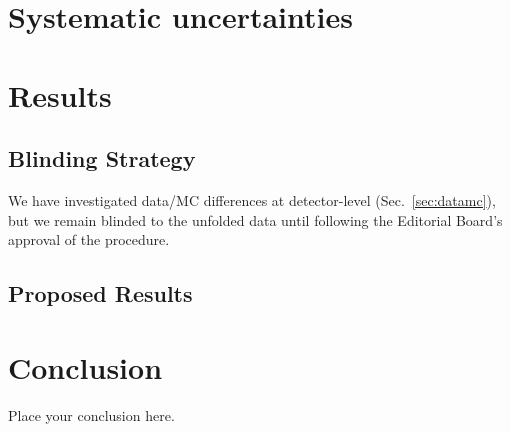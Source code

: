 \documentclass[NOTE, atlasdraft=true, texlive=2016, UKenglish]{\ATLASLATEXPATH atlasdoc}
\begin{document}
\clearpage

\section{Systematic uncertainties}
\label{sec:uncerts}



\section{Results}
\label{sec:result}

\subsection{Blinding Strategy}

We have investigated data/MC differences at detector-level (Sec.~\ref{sec:datamc}), but we remain blinded to the unfolded data until following the Editorial Board's approval of the procedure.

\subsection{Proposed Results}



\section{Conclusion}
\label{sec:conclusion}

Place your conclusion here.


\printbibliography
%
%

\clearpage
\end{document}
